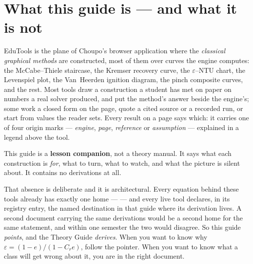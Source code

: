 \documentclass[11pt,a4paper]{article}
\title{}
\author{}
\date{}
\begin{document}

\setcounter{tocdepth}{1}
\tableofcontents
\clearpage
{}
\setcounter{page}{1}

\section{What this guide is --- and what it is not}\label{sec:edu-what}

EduTools is the plane of Choupo's browser application where the
\emph{classical graphical methods} are constructed, most of them over
curves the engine computes: the McCabe--Thiele staircase, the Kremser
recovery curve, the $\varepsilon$--NTU chart, the Levenspiel plot, the
Van~Heerden ignition diagram, the pinch composite curves, and the rest.
Most tools draw a construction a student has met on paper on numbers a
real solver produced, and put the method's answer beside the engine's;
some work a closed form on the page, quote a cited source or a recorded
run, or start from values the reader sets.  Every result on a page says
which: it carries one of four origin marks --- \emph{engine},
\emph{page}, \emph{reference} or \emph{assumption} --- explained in a
legend above the tool.

\begin{keyidea}
This guide is a \textbf{lesson companion}, not a theory manual.  It says
what each construction is \emph{for}, what to turn, what to watch, and
what the picture is silent about.  It contains no derivations at all.
\end{keyidea}

That absence is deliberate and it is architectural.  Every equation behind
these tools already has exactly one home ---  ---
and every live tool declares, in its registry entry, the named destination
in that guide where its derivation lives.  A second document carrying the
same derivations would be a second home for the same statement, and within
one semester the two would disagree.  So this guide \emph{points}, and the
Theory Guide \emph{derives}.  When you want to know why
$\varepsilon = (1-e)/(1-C_r e)$, follow the pointer.  When you want to know
what a class will get wrong about it, you are in the right document.
\end{document}
